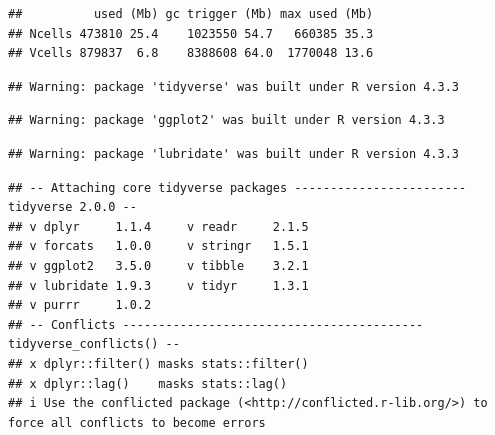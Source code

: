 \documentclass[11pt,preprint, authoryear]{elsarticle}
\numberwithin{equation}{section}
\numberwithin{figure}{section}
\numberwithin{table}{section}
\begin{document}
\begin{verbatim}
##          used (Mb) gc trigger (Mb) max used (Mb)
## Ncells 473810 25.4    1023550 54.7   660385 35.3
## Vcells 879837  6.8    8388608 64.0  1770048 13.6
\end{verbatim}

\begin{Shaded}
\begin{Highlighting}[]
\end{Highlighting}
\end{Shaded}

\begin{verbatim}
## Warning: package 'tidyverse' was built under R version 4.3.3
\end{verbatim}

\begin{verbatim}
## Warning: package 'ggplot2' was built under R version 4.3.3
\end{verbatim}

\begin{verbatim}
## Warning: package 'lubridate' was built under R version 4.3.3
\end{verbatim}

\begin{verbatim}
## -- Attaching core tidyverse packages ------------------------ tidyverse 2.0.0 --
## v dplyr     1.1.4     v readr     2.1.5
## v forcats   1.0.0     v stringr   1.5.1
## v ggplot2   3.5.0     v tibble    3.2.1
## v lubridate 1.9.3     v tidyr     1.3.1
## v purrr     1.0.2     
## -- Conflicts ------------------------------------------ tidyverse_conflicts() --
## x dplyr::filter() masks stats::filter()
## x dplyr::lag()    masks stats::lag()
## i Use the conflicted package (<http://conflicted.r-lib.org/>) to force all conflicts to become errors
\end{verbatim}

\begin{Shaded}
\begin{Highlighting}[]
\NormalTok{(}\NormalTok{)}
\NormalTok{(}\NormalTok{, }\SpecialCharTok{\%\textgreater{}\%}\NormalTok{ .[}\NormalTok{(}\NormalTok{, .)] }\SpecialCharTok{\%\textgreater{}\%} \NormalTok{() }\SpecialCharTok{\%\textgreater{}\%} \NormalTok{(}\SpecialCharTok{\textasciitilde{}}
\end{Highlighting}
\end{Shaded}
\end{document}
